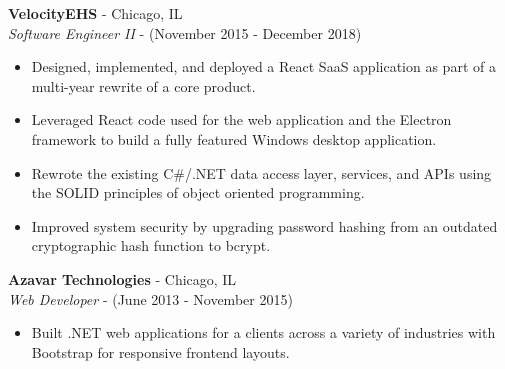 \documentclass[11pt]{article}
\begin{document}
\begin{paracol}{2}
\noindent \textbf{VelocityEHS} - Chicago, IL \\
\textit{Software Engineer II} - {\footnotesize{(November 2015 - December 2018)}}
\begin{itemize}
    \item Designed, implemented, and deployed a React SaaS application as part of a multi-year rewrite of a core product.
    \item Leveraged React code used for the web application and the Electron framework to build a fully featured Windows desktop application.
    \item Rewrote the existing C\#/.NET data access layer, services, and APIs using the SOLID principles of object oriented programming.
    \item Improved system security by upgrading password hashing from an outdated cryptographic hash function to bcrypt.
\end{itemize} 

\noindent \textbf{Azavar Technologies} - Chicago, IL \\
\textit{Web Developer} - {\footnotesize(June 2013 - November 2015)}
\begin{itemize}
    \item Built .NET web applications for a clients across a variety of industries with Bootstrap for responsive frontend layouts.
\end{itemize}
    
\end{paracol}
\end{document}
